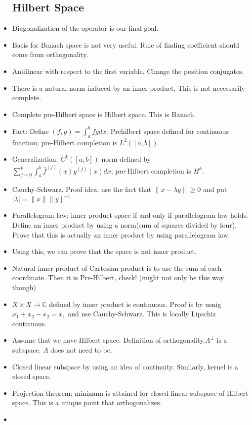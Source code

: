 \documentclass{article}
\theoremstyle{remark}
\begin{document}
\begin{itemize}
\subsection*{Hilbert Space}
\item Diagonalization of the operator is our final goal.
\item Basis for Banach space is not very useful. Rule of finding coefficient should come from orthogonality.
\item Antilinear with respect to the first variable. Change the position conjugates.
\item There is a natural norm induced by an inner product. This is not necessarily complete.
\item Complete pre-Hilbert space is Hilbert space. This is Banach.
\item Fact: Define $(f,g)=\int^b_a fg dx$. Prehilbert space defined for continuous function; pre-Hilbert completion is $L^2([a,b])$.
\item Generalization: $C^k([a,b])$ norm defined by $\sum_{j=0}^k\int_a^b \bar f^{(j)}(x)g^{(j)}(x)dx$; pre-Hilbert completion is $H^k$.
\item Cauchy-Schwarz. Proof idea: use the fact that $\lVert x-\lambda y\rVert\geq 0$ and put $\mid\lambda\mid=\lVert x\rVert \lVert y\rVert^{-1}$
\item Parallelogram law; inner product space if and only if parallelogram law holds. Define an inner product by using a norm(sum of squares divided by four). Prove that this is actually an inner product by using parallelogram law.
\item Using this, we can prove that the space is not inner product.
\item Natural inner product of Cartesian product is to use the sum of each coordinate. Then it is Pre-Hilbert, check! (might not only be this way though)

\item $X\times X\to\mathbb{C}$ defined by inner product is continuous. Proof is by usnig $x_1+x_2-x_2=x_1$ and use Cauchy-Schwarz. This is locally Lipschiz continuous.

\item Assume that we have Hilbert space. Definition of orthogonality.$A^\perp$ is a subspace. $A$ does not need to be.

\item Closed linear subspace by using an idea of continuity. Similarly, kernel is a closed space.

\item Projection theorem: minimum is attained for closed linear subspace of Hilbert space. This is a unique point that orthogonalizes.

\item 
\end{itemize}
\end{document}
